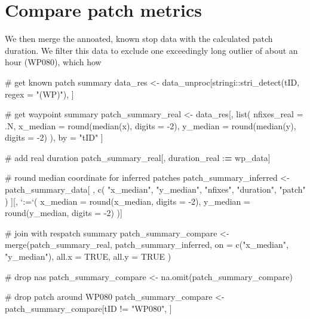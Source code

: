 \documentclass[]{scrreprt}
\newenvironment{Shaded}{}{}
\newcommand{\CommentTok}[1]{\textcolor[rgb]{0.00,0.50,0.00}{#1}}
\newcommand{\DataTypeTok}[1]{#1}
\newcommand{\DecValTok}[1]{#1}
\newcommand{\ErrorTok}[1]{\textcolor[rgb]{1.00,0.00,0.00}{\textbf{#1}}}
\newcommand{\KeywordTok}[1]{\textcolor[rgb]{0.00,0.00,1.00}{#1}}
\newcommand{\NormalTok}[1]{#1}
\newcommand{\OperatorTok}[1]{#1}
\newcommand{\OtherTok}[1]{\textcolor[rgb]{1.00,0.25,0.00}{#1}}
\newcommand{\StringTok}[1]{\textcolor[rgb]{0.00,0.50,0.50}{#1}}
\begin{document}
\hypertarget{compare-patch-metrics}{%
\section{Compare patch metrics}\label{compare-patch-metrics}}

We then merge the annoated, known stop data with the calculated patch duration.
We filter this data to exclude one exceedingly long outlier of about an hour (WP080), which how

\begin{Shaded}
\begin{Highlighting}[]
\CommentTok{# get known patch summary}
\NormalTok{data_res <-}\StringTok{ }\NormalTok{data_unproc[stringi}\OperatorTok{::}\KeywordTok{stri_detect}\NormalTok{(tID, }\DataTypeTok{regex =} \StringTok{"(WP)"}\NormalTok{), ]}

\CommentTok{# get waypoint summary}
\NormalTok{patch_summary_real <-}\StringTok{ }\NormalTok{data_res[, }\KeywordTok{list}\NormalTok{(}
  \DataTypeTok{nfixes_real =}\NormalTok{ .N,}
  \DataTypeTok{x_median =} \KeywordTok{round}\NormalTok{(}\KeywordTok{median}\NormalTok{(x), }\DataTypeTok{digits =} \DecValTok{-2}\NormalTok{),}
  \DataTypeTok{y_median =} \KeywordTok{round}\NormalTok{(}\KeywordTok{median}\NormalTok{(y), }\DataTypeTok{digits =} \DecValTok{-2}\NormalTok{)}
\NormalTok{),}
\NormalTok{by =}\StringTok{ "tID"}
\NormalTok{]}

\CommentTok{# add real duration}
\NormalTok{patch_summary_real[, duration_real }\OperatorTok{:}\ErrorTok{=}\StringTok{ }\NormalTok{wp_data]}

\CommentTok{# round median coordinate for inferred patches}
\NormalTok{patch_summary_inferred <-}
\StringTok{  }\NormalTok{patch_summary_data[}
\NormalTok{    ,}
    \KeywordTok{c}\NormalTok{(}
      \StringTok{"x_median"}\NormalTok{, }\StringTok{"y_median"}\NormalTok{,}
      \StringTok{"nfixes"}\NormalTok{, }\StringTok{"duration"}\NormalTok{, }\StringTok{"patch"}
\NormalTok{    )}
\NormalTok{  ][, }\StringTok{`}\DataTypeTok{:=}\StringTok{`}\NormalTok{(}
    \DataTypeTok{x_median =} \KeywordTok{round}\NormalTok{(x_median, }\DataTypeTok{digits =} \DecValTok{-2}\NormalTok{),}
    \DataTypeTok{y_median =} \KeywordTok{round}\NormalTok{(y_median, }\DataTypeTok{digits =} \DecValTok{-2}\NormalTok{)}
\NormalTok{  )]}

\CommentTok{# join with respatch summary}
\NormalTok{patch_summary_compare <-}
\StringTok{  }\KeywordTok{merge}\NormalTok{(patch_summary_real,}
\NormalTok{    patch_summary_inferred,}
    \DataTypeTok{on =} \KeywordTok{c}\NormalTok{(}\StringTok{"x_median"}\NormalTok{, }\StringTok{"y_median"}\NormalTok{),}
    \DataTypeTok{all.x =} \OtherTok{TRUE}\NormalTok{, }\DataTypeTok{all.y =} \OtherTok{TRUE}
\NormalTok{  )}

\CommentTok{# drop nas}
\NormalTok{patch_summary_compare <-}\StringTok{ }\KeywordTok{na.omit}\NormalTok{(patch_summary_compare)}

\CommentTok{# drop patch around WP080}
\NormalTok{patch_summary_compare <-}\StringTok{ }\NormalTok{patch_summary_compare[tID }\OperatorTok{!=}\StringTok{ "WP080"}\NormalTok{, ]}
\end{Highlighting}
\end{Shaded}
\end{document}
